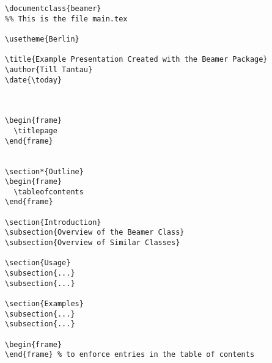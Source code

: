 \begin{verbatim}
\documentclass{beamer}
%% This is the file main.tex

\usetheme{Berlin}

\title{Example Presentation Created with the Beamer Package}
\author{Till Tantau}
\date{\today}



\begin{frame}
  \titlepage
\end{frame}


\section*{Outline}
\begin{frame}
  \tableofcontents
\end{frame}

\section{Introduction}
\subsection{Overview of the Beamer Class}
\subsection{Overview of Similar Classes}

\section{Usage}
\subsection{...}
\subsection{...}

\section{Examples}
\subsection{...}
\subsection{...}

\begin{frame}
\end{frame} % to enforce entries in the table of contents


\end{verbatim}
